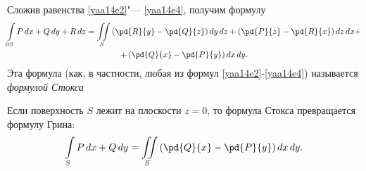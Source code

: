 Сложив равенства \eqref{yaa14e2}"--- \eqref{yaa14e4}, получим формулу
\begin{multline*}
\int\limits_{\partial S} P\,dx+Q\,dy+R\,dz = \iint\limits_S \left(\pd{R}{y}-\pd{Q}{z}\right)dy\,dz + \left(\pd{P}{z}-\pd{R}{x}\right)dz\,dx+\\+\left(\pd{Q}{x}-\pd{P}{y}\right)dx\,dy.
\end{multline*}
Эта формула (как, в частности, любая из формул \eqref{yaa14e2}-\eqref{yaa14e4}) называется \textit{формулой Стокса}

Если поверхность $S$ лежит на плоскости $z=0$, то формула Стокса превращается формулу Грина: 
$$
\int\limits_S P\,dx+Q\,dy = \iint\limits_S\left(\pd{Q}{x}-\pd{P}{y}\right)dx\,dy.
$$


